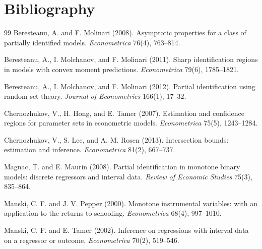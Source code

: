 \documentclass[11pt]{article}
\theoremstyle{definition}
\theoremstyle{plain}
\theoremstyle{remark}
\begin{document}
\section*{Bibliography}
\begin{thebibliography}{99}
Beresteanu, A. and F. Molinari (2008).
Asymptotic properties for a class of partially identified models.
\emph{Econometrica} 76(4), 763--814.

Beresteanu, A., I. Molchanov, and F. Molinari (2011).
Sharp identification regions in models with convex moment predictions.
\emph{Econometrica} 79(6), 1785--1821.

Beresteanu, A., I. Molchanov, and F. Molinari (2012).
Partial identification using random set theory.
\emph{Journal of Econometrics} 166(1), 17--32.

Chernozhukov, V., H. Hong, and E. Tamer (2007).
Estimation and confidence regions for parameter sets in econometric models.
\emph{Econometrica} 75(5), 1243--1284.

Chernozhukov, V., S. Lee, and A. M. Rosen (2013).
Intersection bounds: estimation and inference.
\emph{Econometrica} 81(2), 667--737.

Magnac, T. and E. Maurin (2008).
Partial identification in monotone binary models: discrete regressors and interval data.
\emph{Review of Economic Studies} 75(3), 835--864.

Manski, C. F. and J. V. Pepper (2000).
Monotone instrumental variables: with an application to the returns to schooling.
\emph{Econometrica} 68(4), 997--1010.

Manski, C. F. and E. Tamer (2002).
Inference on regressions with interval data on a regressor or outcome.
\emph{Econometrica} 70(2), 519--546.
\end{thebibliography}
\end{document}
